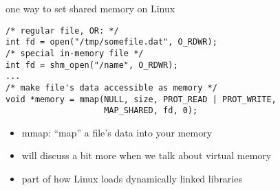 

\begin{frame}[fragile,label=shmMmap]{one way to set shared memory on Linux}
\lstset{style=smaller,language=C++}
\begin{lstlisting}
/* regular file, OR: */
int fd = open("/tmp/somefile.dat", O_RDWR);
/* special in-memory file */
int fd = shm_open("/name", O_RDWR);
...
/* make file's data accessible as memory */
void *memory = mmap(NULL, size, PROT_READ | PROT_WRITE,
                    MAP_SHARED, fd, 0);
\end{lstlisting}
\begin{itemize}
    \item mmap: ``map'' a file's data into your memory
    \item will discuss a bit more when we talk about virtual memory
    \item part of how Linux loads dynamically linked libraries
\end{itemize}
\end{frame}
